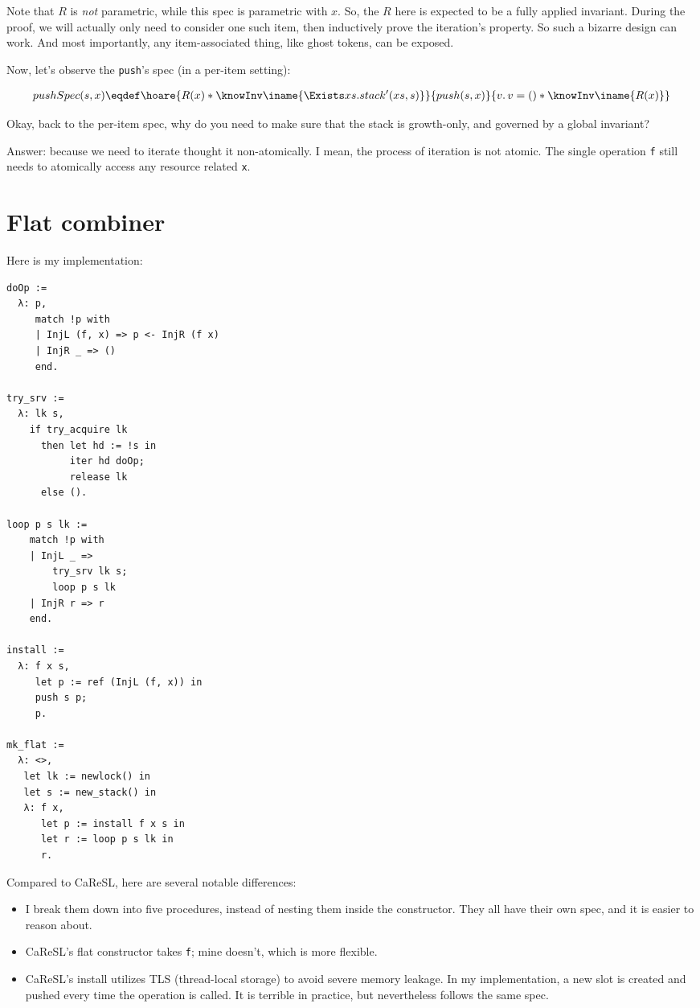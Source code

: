 \documentclass[11pt]{article}
\begin{document}
Note that $R$ is \emph{not} parametric, while this spec is parametric with $x$. So, the $R$ here is expected to be a fully applied invariant. During the proof, we will actually only need to consider one such item, then inductively prove the iteration's property.
So such a bizarre design can work. And most importantly, any item-associated thing, like ghost tokens, can be exposed.

Now, let's observe the \texttt{push}'s spec (in a per-item setting):

\begin{align*}
  pushSpec(s, x) \eqdef \hoare{R(x) * \knowInv\iname{\Exists xs. stack'(xs, s)}}{push(s, x)}{v.\, v = () * \knowInv\iname{R(x)}}
\end{align*}

Okay, back to the per-item spec, why do you need to make sure that the stack is growth-only, and governed by a global invariant?

Answer: because we need to iterate thought it non-atomically. I mean, the process of iteration is not atomic.
The single operation \texttt{f} still needs to atomically access any resource related \texttt{x}.

\section{Flat combiner}

Here is my implementation:

\begin{verbatim}
doOp :=
  λ: p,
     match !p with
     | InjL (f, x) => p <- InjR (f x)
     | InjR _ => ()
     end.

try_srv :=
  λ: lk s,
    if try_acquire lk
      then let hd := !s in
           iter hd doOp;
           release lk
      else ().

loop p s lk :=
    match !p with
    | InjL _ =>
        try_srv lk s;
        loop p s lk
    | InjR r => r
    end.

install :=
  λ: f x s,
     let p := ref (InjL (f, x)) in
     push s p;
     p.

mk_flat :=
  λ: <>,
   let lk := newlock() in
   let s := new_stack() in
   λ: f x,
      let p := install f x s in
      let r := loop p s lk in
      r.
\end{verbatim}

Compared to CaReSL, here are several notable differences:

\begin{itemize}
\item I break them down into five procedures, instead of nesting them inside the constructor. They all have their own spec, and it is easier to reason about.
\item CaReSL’s flat constructor takes \texttt{f}; mine doesn’t, which is more flexible.
\item CaReSL’s install utilizes TLS (thread-local storage) to avoid severe memory leakage. In my implementation, a new slot is created and pushed every time the operation is called. It is terrible in practice, but nevertheless follows the same spec.
\end{itemize}
\end{document}
